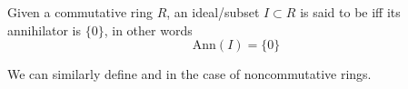\documentclass[12pt]{article}
\begin{document}
Given a commutative ring $R$, an ideal/subset $I\subset R$ is said to be  iff its annihilator is $\{0\}$, in other words
$$\mathrm{Ann}(I)=\{0\}$$

We can similarly define  and  in the case of noncommutative rings.
\end{document}

